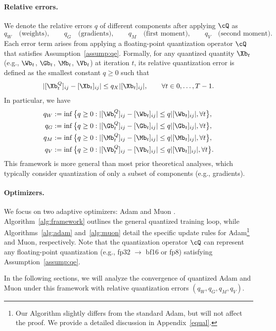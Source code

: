 \documentclass[11pt, letterpaper]{article}
\begin{document}
\paragraph{Relative errors.}
We denote the relative errors $q$ of different components after applying $\cQ$ as
\[
q_W \quad \text{(weights)}, \qquad 
q_G \quad \text{(gradients)}, \qquad 
q_M \quad \text{(first moment)}, \qquad 
q_V \quad \text{(second moment)}.
\]
Each error term arises from applying a floating-point quantization operator $\cQ$ that satisfies Assumption~\ref{assump:qe}. Formally, for any quantized quantity $\Xb_t$ (e.g., $\Wb_t$, $\Gb_t$, $\Mb_t$, $\Vb_t$) at iteration $t$, its relative quantization error is defined as the smallest constant $q \ge 0$ such that
\[
\vert [\Xb_t^Q]_{ij} - [\Xb_t]_{ij} \vert \le q_X \vert [\Xb_t]_{ij}\vert, \qquad \forall t \in {0, \dots, T-1}.
\]
In particular, we have
\begin{align*}
q_W &:= \inf\big\{q \ge 0 : |[\Wb_t^Q]_{ij} - [\Wb_t]_{ij}| \le q |[\Wb_t]_{ij}|, \forall t\big\},\\
q_G &:= \inf\big\{q \ge 0 : |[\Gb_t^Q]_{ij} - [\Gb_t]_{ij}| \le q |[\Gb_t]_{ij}|, \forall t\big\},\\
q_M &:= \inf\big\{q \ge 0 : |[\Mb_t^Q]_{ij} - [\Mb_t]_{ij}| \le q |[\Mb_t]_{ij}|, \forall t\big\},\\
q_V &:= \inf\big\{q \ge 0 : |[\Vb_t^Q]_{ij} - [\Vb_t]_{ij}| \le q |[\Vb_t]]_{ij}|, \forall t\big\}.
\end{align*}
This framework is more general than most prior theoretical analyses, which typically consider quantization of only a subset of components (e.g., gradients).

\paragraph{Optimizers.}
We focus on two adaptive optimizers: Adam \citep{kingma2014adam} and Muon \citep{jordan2024muon}. 
Algorithm~\ref{alg:framework} outlines the general quantized training loop, while Algorithms~\ref{alg:adam} and~\ref{alg:muon} detail the specific update rules for Adam\footnote{Our Algorithm slightly differs from the standard Adam, but will not affect the proof. We provide a detailed discussion in Appendix~\ref{equal}.} and Muon, respectively. 
Note that the quantization operator $\cQ$ can represent any floating-point quantization (e.g., fp32 $\to$ bf16 or fp8) satisfying Assumption~\ref{assump:qe}.

In the following sections, we will analyze the convergence of quantized Adam and Muon under this framework with relative quantization errors $(q_W, q_G, q_M, q_V)$.
\end{document}
